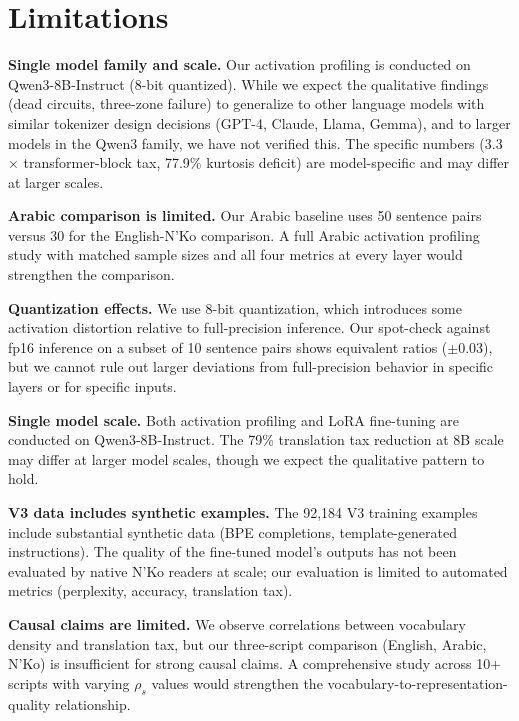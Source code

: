\documentclass[11pt]{article}
\begin{document}
\section{Limitations}

\textbf{Single model family and scale.}
Our activation profiling is conducted on Qwen3-8B-Instruct (8-bit quantized).
While we expect the qualitative findings (dead circuits, three-zone failure) to generalize to other language models with similar tokenizer design decisions (GPT-4, Claude, Llama, Gemma), and to larger models in the Qwen3 family, we have not verified this.
The specific numbers (3.3$\times$ transformer-block tax, 77.9\% kurtosis deficit) are model-specific and may differ at larger scales.

\textbf{Arabic comparison is limited.}
Our Arabic baseline uses 50 sentence pairs versus 30 for the English-N'Ko comparison.
A full Arabic activation profiling study with matched sample sizes and all four metrics at every layer would strengthen the comparison.

\textbf{Quantization effects.}
We use 8-bit quantization, which introduces some activation distortion relative to full-precision inference.
Our spot-check against fp16 inference on a subset of 10 sentence pairs shows equivalent ratios ($\pm$0.03), but we cannot rule out larger deviations from full-precision behavior in specific layers or for specific inputs.

\textbf{Single model scale.}
Both activation profiling and LoRA fine-tuning are conducted on Qwen3-8B-Instruct.
The 79\% translation tax reduction at 8B scale may differ at larger model scales, though we expect the qualitative pattern to hold.

\textbf{V3 data includes synthetic examples.}
The 92,184 V3 training examples include substantial synthetic data (BPE completions, template-generated instructions).
The quality of the fine-tuned model's outputs has not been evaluated by native N'Ko readers at scale; our evaluation is limited to automated metrics (perplexity, accuracy, translation tax).

\textbf{Causal claims are limited.}
We observe correlations between vocabulary density and translation tax, but our three-script comparison (English, Arabic, N'Ko) is insufficient for strong causal claims.
A comprehensive study across 10+ scripts with varying $\rho_s$ values would strengthen the vocabulary-to-representation-quality relationship.
\end{document}
